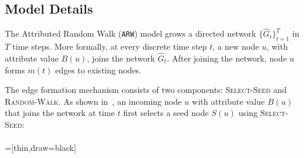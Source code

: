 \subsection{Model Details}
\label{sub:Model Description}
The Attributed Random Walk (\texttt{ARW}) model grows a directed network $\{\hat{G}_t\}^T_{t=1}$
in $T$ time steps.
More formally, at every discrete time step $t$, a
new node $u$, with attribute value $B(u)$, joins the network $\hat{G}_t$.
After joining the network, node $u$ forms $m(t)$ edges to
existing nodes.

The edge formation mechanism consists of two components: \textsc{Select-Seed} and
\textsc{Random-Walk}. As shown in~, an incoming node $u$ with attribute value $B(u)$ that joins the
network at time $t$ first selects a seed node $S(u)$ using \textsc{Select-Seed}:
\\\\
=[thin,draw=black]


